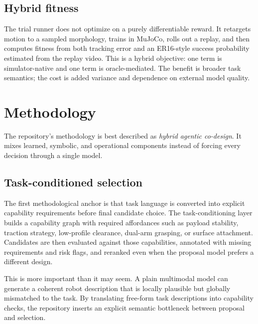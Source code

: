 \documentclass[10pt,letterpaper,twocolumn]{article}
\begin{document}
\subsection{Hybrid fitness}

The trial runner does not optimize on a purely differentiable reward. It retargets motion to a sampled morphology, trains in MuJoCo, rolls out a replay, and then computes fitness from both tracking error and an ER16-style success probability estimated from the replay video. This is a hybrid objective: one term is simulator-native and one term is oracle-mediated. The benefit is broader task semantics; the cost is added variance and dependence on external model quality.

\section{Methodology}

The repository's methodology is best described as \emph{hybrid agentic co-design}. It mixes learned, symbolic, and operational components instead of forcing every decision through a single model.

\subsection{Task-conditioned selection}

The first methodological anchor is that task language is converted into explicit capability requirements before final candidate choice. The task-conditioning layer builds a capability graph with required affordances such as payload stability, traction strategy, low-profile clearance, dual-arm grasping, or surface attachment. Candidates are then evaluated against those capabilities, annotated with missing requirements and risk flags, and reranked even when the proposal model prefers a different design.

This is more important than it may seem. A plain multimodal model can generate a coherent robot description that is locally plausible but globally mismatched to the task. By translating free-form task descriptions into capability checks, the repository inserts an explicit semantic bottleneck between proposal and selection.
\end{document}
